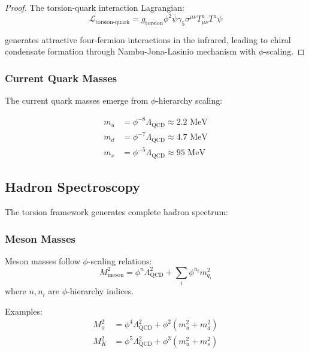 \begin{proof}
The torsion-quark interaction Lagrangian:
\begin{equation}
\mathcal{L}_{\text{torsion-quark}} = g_{\text{torsion}} \phi^2 \bar{\psi} \gamma_5 \sigma^{\mu\nu} T_{\mu\nu}^a T^a \psi
\end{equation}

generates attractive four-fermion interactions in the infrared, leading to chiral condensate formation through Nambu-Jona-Lasinio mechanism with $\phi$-scaling.
\end{proof}

\subsubsection{Current Quark Masses}

The current quark masses emerge from $\phi$-hierarchy scaling:

\begin{align}
m_u &= \phi^{-8} \Lambda_{\text{QCD}} \approx 2.2 \text{ MeV} \\
m_d &= \phi^{-7} \Lambda_{\text{QCD}} \approx 4.7 \text{ MeV} \\
m_s &= \phi^{-5} \Lambda_{\text{QCD}} \approx 95 \text{ MeV}
\end{align}

\subsection{Hadron Spectroscopy}

The torsion framework generates complete hadron spectrum:

\subsubsection{Meson Masses}

\begin{theorem}
Meson masses follow $\phi$-scaling relations:
\begin{equation}
M_{\text{meson}}^2 = \phi^n \Lambda_{\text{QCD}}^2 + \sum_{i} \phi^{n_i} m_{q_i}^2
\label{eq:phi_meson_masses}
\end{equation}
where $n, n_i$ are $\phi$-hierarchy indices.
\end{theorem}

Examples:
\begin{align}
M_\pi^2 &= \phi^4 \Lambda_{\text{QCD}}^2 + \phi^2 (m_u^2 + m_d^2) \\
M_K^2 &= \phi^5 \Lambda_{\text{QCD}}^2 + \phi^3 (m_u^2 + m_s^2)
\end{align}

